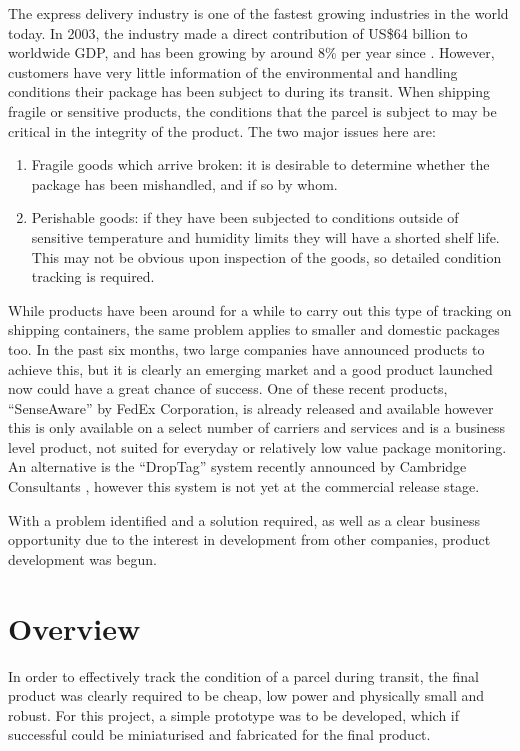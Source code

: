 \documentclass[a4paper,10pt]{article}  %
\begin{document}
The express delivery industry is one of the fastest growing industries
in the world today. In 2003, the industry made a direct contribution
of US\$64 billion to worldwide GDP, and has been growing by around 8\%
per year since \cite{OEF2005}. However, customers have very little
information of the environmental and handling conditions their package
has been subject to during its transit. When shipping fragile or
sensitive products, the conditions that the parcel is subject to may
be critical in the integrity of the product. The two major issues here
are:
\begin{enumerate}
\item Fragile goods which arrive broken: it is desirable to determine
  whether the package has been mishandled, and if so by whom.
\item Perishable goods: if they have been subjected to conditions
  outside of sensitive temperature and humidity limits they will have
  a shorted shelf life. This may not be obvious upon inspection of the
  goods, so detailed condition tracking is required.
\end{enumerate}
While products have been around for a while to carry out this type of
tracking on shipping containers, the same problem applies to smaller
and domestic packages too. In the past six months, two large companies
have announced products to achieve this, but it is clearly an emerging
market and a good product launched now could have a great chance of
success. One of these recent products, ``SenseAware''\cite{SA_PR} by
FedEx Corporation, is already released and available however this is
only available on a select number of carriers and services and is a
business level product, not suited for everyday or relatively low
value package monitoring. An alternative is the ``DropTag'' system
recently announced by Cambridge Consultants \cite{DT_PR}, however this
system is not yet at the commercial release stage.

With a problem identified and a solution required, as well as a clear
business opportunity due to the interest in development from other
companies, product development was begun.

\section{Overview}
\label{sec:overview}

In order to effectively track the condition of a parcel during
transit, the final product was clearly required to be cheap, low power
and physically small and robust. For this project, a simple prototype
was to be developed, which if successful could be miniaturised and
fabricated for the final product.
\end{document}

